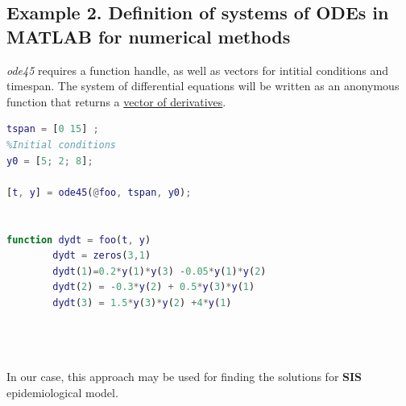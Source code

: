 \documentclass[10pt]{report}
\begin{document}
\subsection*{Example 2. Definition of systems of ODEs in MATLAB for numerical methods }

{\emph{ode45}} requires a function handle, as well as vectors for intitial conditions and timespan. The system of differential equations will be written as an anonymous function that returns a {\underline{vector of derivatives}}.

\begin{lstlisting}[language=Matlab, caption={An example of system with numerical solutions for system with three unknown functions}]
%Interval of integration
tspan = [0 15] ;
%Initial conditions
y0 = [5; 2; 8];

[t, y] = ode45(@foo, tspan, y0);


function dydt = foo(t, y)
        dydt = zeros(3,1)
        dydt(1)=0.2*y(1)*y(3) -0.05*y(1)*y(2)
        dydt(2) = -0.3*y(2) + 0.5*y(3)*y(1)
        dydt(3) = 1.5*y(3)*y(2) +4*y(1)

	
	
\end{lstlisting}
\medskip
In our case, this approach may be used for finding the solutions for {\bf{SIS}} epidemiological model.
\end{document}
